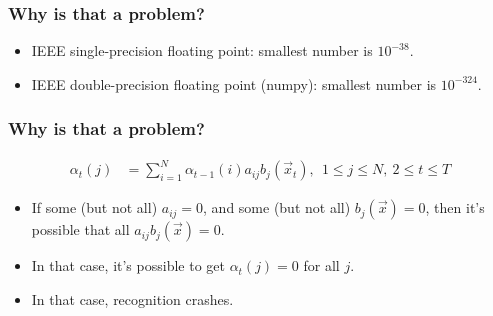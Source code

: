 \documentclass{beamer}
\begin{document}

\begin{frame}
  \frametitle{Why is that a problem?}

  \begin{itemize}
  \item IEEE single-precision floating  point: smallest number is $10^{-38}$.
  \item IEEE double-precision floating point (numpy): smallest number is $10^{-324}$.
  \end{itemize}
\end{frame}

\begin{frame}
  \frametitle{Why is that a problem?}

  \begin{align*}
    \alpha_{t}(j) &= \sum_{i=1}^N \alpha_{t-1}(i) a_{ij}b_j(\vec{x}_t),~~1\le j\le N,~2\le t\le T
  \end{align*}
  \begin{itemize}
  \item If some (but not all) $a_{ij}=0$, and some (but not all)
    $b_j(\vec{x})=0$, then it's possible that all $a_{ij}b_j(\vec{x})=0$.
  \item In that case, it's possible to get $\alpha_t(j)=0$ for all $j$.
  \item In that case, recognition crashes.
  \end{itemize}
\end{frame}
\end{document}
